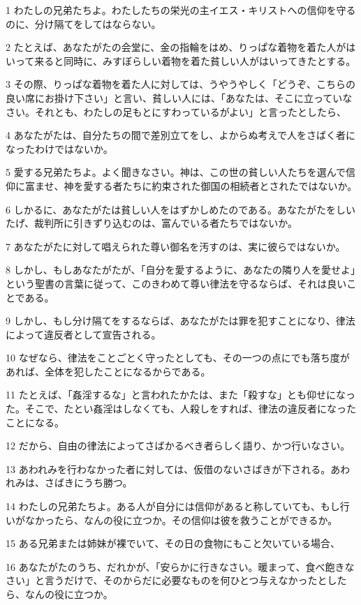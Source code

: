 \par 1 わたしの兄弟たちよ。わたしたちの栄光の主イエス・キリストへの信仰を守るのに、分け隔てをしてはならない。
\par 2 たとえば、あなたがたの会堂に、金の指輪をはめ、りっぱな着物を着た人がはいって来ると同時に、みすぼらしい着物を着た貧しい人がはいってきたとする。
\par 3 その際、りっぱな着物を着た人に対しては、うやうやしく「どうぞ、こちらの良い席にお掛け下さい」と言い、貧しい人には、「あなたは、そこに立っていなさい。それとも、わたしの足もとにすわっているがよい」と言ったとしたら、
\par 4 あなたがたは、自分たちの間で差別立てをし、よからぬ考えで人をさばく者になったわけではないか。
\par 5 愛する兄弟たちよ。よく聞きなさい。神は、この世の貧しい人たちを選んで信仰に富ませ、神を愛する者たちに約束された御国の相続者とされたではないか。
\par 6 しかるに、あなたがたは貧しい人をはずかしめたのである。あなたがたをしいたげ、裁判所に引きずり込むのは、富んでいる者たちではないか。
\par 7 あなたがたに対して唱えられた尊い御名を汚すのは、実に彼らではないか。
\par 8 しかし、もしあなたがたが、「自分を愛するように、あなたの隣り人を愛せよ」という聖書の言葉に従って、このきわめて尊い律法を守るならば、それは良いことである。
\par 9 しかし、もし分け隔てをするならば、あなたがたは罪を犯すことになり、律法によって違反者として宣告される。
\par 10 なぜなら、律法をことごとく守ったとしても、その一つの点にでも落ち度があれば、全体を犯したことになるからである。
\par 11 たとえば、「姦淫するな」と言われたかたは、また「殺すな」とも仰せになった。そこで、たとい姦淫はしなくても、人殺しをすれば、律法の違反者になったことになる。
\par 12 だから、自由の律法によってさばかるべき者らしく語り、かつ行いなさい。
\par 13 あわれみを行わなかった者に対しては、仮借のないさばきが下される。あわれみは、さばきにうち勝つ。
\par 14 わたしの兄弟たちよ。ある人が自分には信仰があると称していても、もし行いがなかったら、なんの役に立つか。その信仰は彼を救うことができるか。
\par 15 ある兄弟または姉妹が裸でいて、その日の食物にもこと欠いている場合、
\par 16 あなたがたのうち、だれかが、「安らかに行きなさい。暖まって、食べ飽きなさい」と言うだけで、そのからだに必要なものを何ひとつ与えなかったとしたら、なんの役に立つか。
